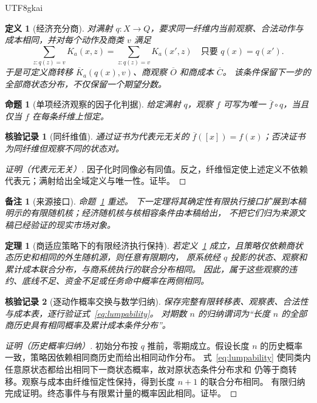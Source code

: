 \documentclass[12pt,a4paper,openany]{report}
\newtheorem{definition}{定义}[chapter]
\newtheorem{theorem}{定理}[chapter]
\newtheorem{proposition}{命题}[chapter]
\newtheorem{remark}{备注}[chapter]
\newtheorem{Certificate}{核验记录}[chapter]
\begin{document}
\begin{CJK*}{UTF8}{gkai}
\begin{definition}[经济充分商]
\label{def:quotient}
对满射 $q:X\to Q$，要求同一纤维内当前观察、合法动作与成本相同，并对每个动作及商类 $v$ 满足
\begin{equation}\label{eq:lumpability}
 \sum_{z:q(z)=v}K_a(x,z)
 =\sum_{z:q(z)=v}K_a(x',z)
 \quad\text{只要 }q(x)=q(x').
\end{equation}
于是可定义商转移 $\overline K_a(q(x),v)$、商观察 $\overline O$ 和商成本 $\overline C$。
该条件保留下一步的全部商状态分布，不仅保留一个期望分数。
\end{definition}

\begin{proposition}[单项经济观察的因子化判据]
\label{prop:factorization}
给定满射 $q$，观察 $f$ 可写为唯一 $\overline f\circ q$，当且仅当 $f$ 在每条纤维上恒定。
\end{proposition}
\begin{Certificate}[同纤维值]
通过证书为代表元无关的 $\overline f([x])=f(x)$；否决证书为同纤维但观察不同的状态对。
\end{Certificate}
\begin{proof}[证明（代表元无关）]
因子化时同像必有同值。反之，纤维恒定使上述定义不依赖代表元；满射给出全域定义与唯一性。证毕。
\end{proof}

\begin{remark}[来源接口]
命题~\ref{prop:factorization} 重述\cite[标签 \texttt{thm:utility-type}]{SourceGFramework}。
下一定理将其确定性有限执行接口扩展到本稿明示的有限随机核；经济随机核与核相容条件由本稿给出，
不把它们归为来源文稿已经验证的现实市场对象。
\end{remark}

\begin{theorem}[商适应策略下的有限经济执行保持]
\label{thm:markov-preservation}
若定义~\ref{def:quotient} 成立，且策略仅依赖商状态历史和相同的外生随机源，则任意有限期内，
原系统经 $q$ 投影的状态、观察和累计成本联合分布，与商系统执行的联合分布相同。
因此，属于这些观察的违约、底线不足、资金不足或任务命中概率在两侧相同。
\end{theorem}
\begin{Certificate}[逐动作概率交换与数学归纳]
保存完整有限转移表、观察表、合法性与成本表，逐行验证式~\eqref{eq:lumpability}。
对期数 $n$ 的归纳谓词为“长度 $n$ 的全部商历史具有相同概率及累计成本条件分布”。
\end{Certificate}
\begin{proof}[证明（历史概率归纳）]
初始分布按 $q$ 推前，零期成立。假设长度 $n$ 的历史概率一致，策略因依赖相同商历史而给出相同动作分布。
式~\eqref{eq:lumpability} 使同类内任意原状态都给出相同下一商状态概率，故对原状态条件分布求和
仍等于商转移。观察与成本由纤维恒定性保持，得到长度 $n+1$ 的联合分布相同。
有限归纳完成证明。终态事件与有限累计量的概率因此相同。证毕。
\end{proof}


\end{CJK*}
\end{document}
